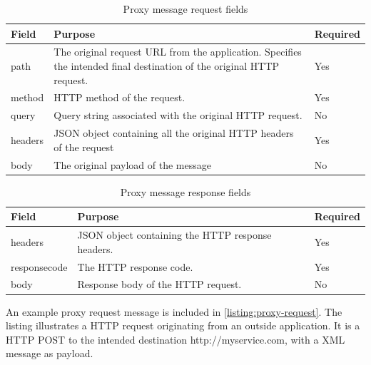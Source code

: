 \begin{table}[h]
\begin{tabularx}{\textwidth}{|l|X|l|}
\hline
\textbf{Field} & \textbf{Purpose}                                                                                                      & \textbf{Required} \\ \hline
path           & The original request URL from the application. Specifies the intended final destination of the original HTTP request. & Yes               \\ \hline
method         & HTTP method of the request.                                                                                           & Yes               \\ \hline
query          & Query string associated with the original HTTP request.                                                               & No                \\ \hline
headers        & JSON object containing all the original HTTP headers of the request                                                   & Yes               \\ \hline
body           & The original payload of the message                                                                                   & No                \\ \hline
\end{tabularx}
\caption{Proxy message request fields}
\label{table-proxy-request}
\end{table}

\begin{table}[h]
\begin{tabularx}{\textwidth}{|l|X|l|}
\hline
\textbf{Field} & \textbf{Purpose}   & \textbf{Required} \\ \hline
headers        & JSON object containing the HTTP response headers. & Yes  \\ \hline
responsecode   & The HTTP response code. & Yes \\ \hline
body           & Response body of the HTTP request. & No            \\ \hline
\end{tabularx}
\caption{Proxy message response fields}
\label{table-proxy-response}

\end{table}

An example proxy request message is included in \cref{listing:proxy-request}.
The listing illustrates a HTTP request originating from an outside application.
It is a HTTP POST to the intended destination http://myservice.com, with a XML
message as payload.

